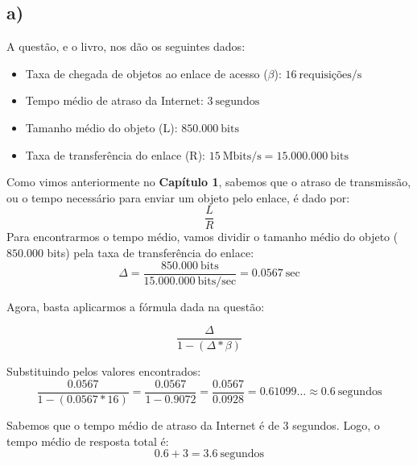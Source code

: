 \documentclass{homework}
\begin{document}
\begin{exercise}[P9)]
\subsection*{a)}

A questão, e o livro, nos dão os seguintes dados:

\begin{itemize}
    \item Taxa de chegada de objetos ao enlace de acesso ($\beta$): $16\ \text{requisições/s}$ 
    \item Tempo médio de atraso da Internet: $3\ \text{segundos}$ 
    \item Tamanho médio do objeto (L): $850.000\ \text{bits}$
    \item Taxa de transferência do enlace (R): $15\ \text{Mbits/s} = 15.000.000\ \text{bits}$
\end{itemize}

Como vimos anteriormente no \textbf{Capítulo 1}, sabemos que o atraso de transmissão, ou o tempo necessário para enviar um objeto pelo enlace, é dado por:
\begin{equation*}
    \frac{L}{R}
\end{equation*}
Para encontrarmos o tempo médio, vamos dividir o tamanho médio do objeto ($850.000$ bits) pela taxa de transferência do enlace:
\begin{equation*}
\Delta = \frac{850.000\ \text{bits}}{15.000.000\ \text{bits/sec}} = 0.0567\ \text{sec}
\end{equation*}

Agora, basta aplicarmos a fórmula dada na questão:

\begin{equation*}
    \frac{\Delta}{1 - (\Delta * \beta)}
\end{equation*}

Substituindo pelos valores encontrados:
\begin{equation*}
    \frac{0.0567}{1 - (0.0567 * 16)} = \frac{0.0567}{1 - 0.9072} = \frac{0.0567}{0.0928} = 0.61099\ldots \approx 0.6\ \text{segundos}
\end{equation*}


Sabemos que o tempo médio de atraso da Internet é de $3$ segundos. Logo, o tempo médio de resposta total é:
\begin{equation*}
    0.6 + 3 = 3.6\ \text{segundos}
\end{equation*}
\end{exercise}
\end{document}
